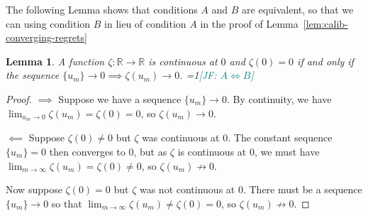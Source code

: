 \documentclass{article} %
\newcommand{\Comments}{0}
\newcommand{\mynote}[2]{\ifnum\Comments=1\textcolor{#1}{#2}\fi}
\newcommand{\jessie}[1]{\mynote{teal}{[JF: #1]}}
\newcommand{\reals}{\mathbb{R}}
\newtheorem{lemma}{Lemma}
\begin{document}
The following Lemma shows that conditions $A$ and $B$ are equivalent, so that we can using condition $B$ in lieu of condition $A$ in the proof of Lemma~\ref{lem:calib-converging-regrets}
\begin{lemma}\label{lem:continuous-iff-limits}
	A function $\zeta:\reals \to \reals$ is continuous at $0$ and $\zeta(0) = 0$ if and only if the sequence $\{u_m\} \to 0 \implies \zeta(u_m) \to 0$.
	\jessie{$A \iff B$}
\end{lemma}
\begin{proof}
	$\implies$ Suppose we have a sequence $\{u_m\} \to 0$.
	By continuity, we have $\lim_{u_m \to 0}\zeta(u_m) = \zeta(0) = 0$, so $\zeta(u_m) \to 0$.
	
	$\impliedby$ Suppose $\zeta(0) \neq 0$ but $\zeta$ was continuous at $0$.
	The constant sequence $\{u_m\} = 0$ then converges to $0$, but as $\zeta$ is continuous at $0$, we must have $\lim_{m \to \infty}\zeta(u_m) = \zeta(0) \neq 0$, so $\zeta(u_m) \not \to 0$.
	
	Now suppose $\zeta(0) = 0$ but $\zeta$ was not continuous at $0$.
	There must be a sequence $\{u_m\} \to 0$ so that $\lim_{m \to \infty}\zeta(u_m) \neq \zeta(0) = 0$, so $\zeta(u_m) \not \to 0$.
\end{proof}
\end{document}
